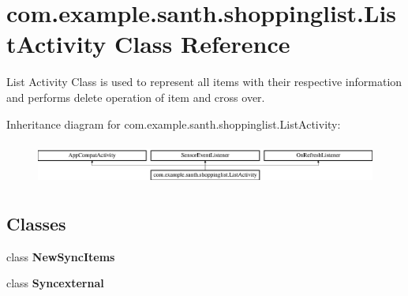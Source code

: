 \hypertarget{classcom_1_1example_1_1santh_1_1shoppinglist_1_1_list_activity}{}\section{com.\+example.\+santh.\+shoppinglist.\+List\+Activity Class Reference}
\label{classcom_1_1example_1_1santh_1_1shoppinglist_1_1_list_activity}


List Activity Class is used to represent all items with their respective information and performs delete operation of item and cross over.  


Inheritance diagram for com.\+example.\+santh.\+shoppinglist.\+List\+Activity\+:\begin{figure}[H]
\begin{center}
\leavevmode
\includegraphics[height=1.424936cm]{classcom_1_1example_1_1santh_1_1shoppinglist_1_1_list_activity}
\end{center}
\end{figure}
\subsection*{Classes}
\begin{DoxyCompactItemize}
\item 
class {\bfseries New\+Sync\+Items}
\item 
class {\bfseries Syncexternal}
\end{DoxyCompactItemize}
